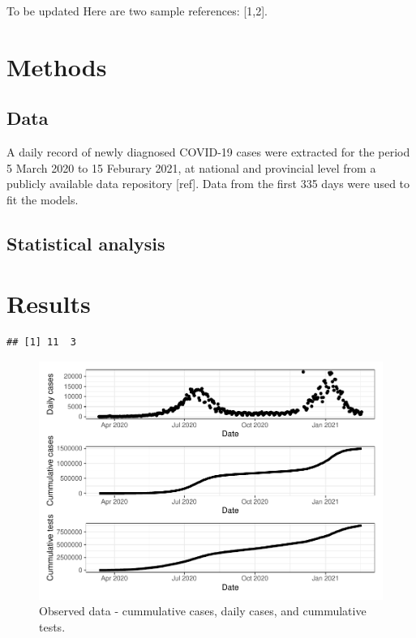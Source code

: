 \documentclass[10pt,letterpaper]{article}
\begin{document}
To be updated Here are two sample references: {[}1,2{]}.

\hypertarget{methods}{%
\section{Methods}\label{methods}}

\hypertarget{data}{%
\subsection{Data}\label{data}}

A daily record of newly diagnosed COVID-19 cases were extracted for the
period 5 March 2020 to 15 Feburary 2021, at national and provincial
level from a publicly available data repository {[}ref{]}. Data from the
first 335 days were used to fit the models.

\hypertarget{statistical-analysis}{%
\subsection{Statistical analysis}\label{statistical-analysis}}

\hypertarget{results}{%
\section{Results}\label{results}}

\begin{verbatim}
## [1] 11  3
\end{verbatim}

\begin{figure}
\includegraphics[width=0.9\linewidth]{COVIDincidenceSA_files/figure-latex/unnamed-chunk-4-1} \caption{Observed data - cummulative cases, daily cases, and cummulative tests.}\label{fig:unnamed-chunk-4}
\end{figure}
\end{document}

